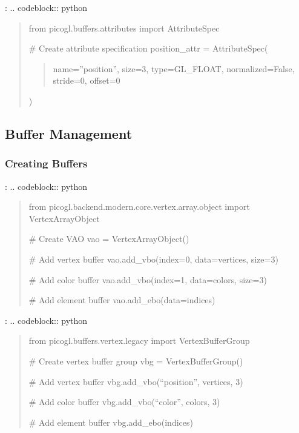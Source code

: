 \documentclass[a4paper,10pt,english,openany,oneside]{sphinxmanual}
\begin{document}
\sphinxAtStartPar
{}:
.. code\sphinxhyphen{}block:: python
\begin{quote}

\sphinxAtStartPar
from picogl.buffers.attributes import AttributeSpec

\sphinxAtStartPar
\# Create attribute specification
position\_attr = AttributeSpec(
\begin{quote}

\sphinxAtStartPar
name=”position”,
size=3,
type=GL\_FLOAT,
normalized=False,
stride=0,
offset=0
\end{quote}

\sphinxAtStartPar
)
\end{quote}


\subsection{Buffer Management}
\label{\detokenize{api/buffers:buffer-management}}

\subsubsection{Creating Buffers}
\label{\detokenize{api/buffers:creating-buffers}}
\sphinxAtStartPar
{}:
.. code\sphinxhyphen{}block:: python
\begin{quote}

\sphinxAtStartPar
from picogl.backend.modern.core.vertex.array.object import VertexArrayObject

\sphinxAtStartPar
\# Create VAO
vao = VertexArrayObject()

\sphinxAtStartPar
\# Add vertex buffer
vao.add\_vbo(index=0, data=vertices, size=3)

\sphinxAtStartPar
\# Add color buffer
vao.add\_vbo(index=1, data=colors, size=3)

\sphinxAtStartPar
\# Add element buffer
vao.add\_ebo(data=indices)
\end{quote}

\sphinxAtStartPar
{}:
.. code\sphinxhyphen{}block:: python
\begin{quote}

\sphinxAtStartPar
from picogl.buffers.vertex.legacy import VertexBufferGroup

\sphinxAtStartPar
\# Create vertex buffer group
vbg = VertexBufferGroup()

\sphinxAtStartPar
\# Add vertex buffer
vbg.add\_vbo(“position”, vertices, 3)

\sphinxAtStartPar
\# Add color buffer
vbg.add\_vbo(“color”, colors, 3)

\sphinxAtStartPar
\# Add element buffer
vbg.add\_ebo(indices)
\end{quote}
\end{document}
